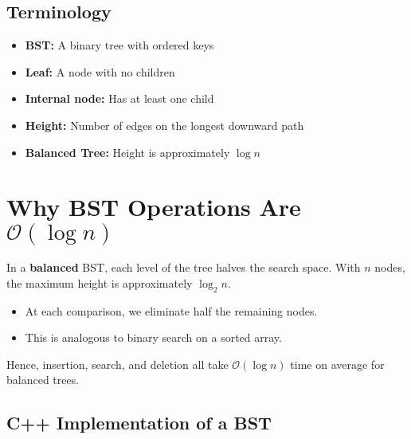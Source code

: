 \documentclass{article}
\begin{document}
\subsection{Terminology}
\begin{itemize}
  \item \textbf{BST:} A binary tree with ordered keys
  \item \textbf{Leaf:} A node with no children
  \item \textbf{Internal node:} Has at least one child
  \item \textbf{Height:} Number of edges on the longest downward path
  \item \textbf{Balanced Tree:} Height is approximately $\log n$
\end{itemize}



\section{Why BST Operations Are $\mathcal{O}(\log n)$}

In a \textbf{balanced} BST, each level of the tree halves the search space. With $n$ nodes, the maximum height is approximately $\log_2 n$.

\begin{itemize}
  \item At each comparison, we eliminate half the remaining nodes.
  \item This is analogous to binary search on a sorted array.
\end{itemize}

Hence, insertion, search, and deletion all take $\mathcal{O}(\log n)$ time on average for balanced trees.



\subsection{C++ Implementation of a BST}
\end{document}
